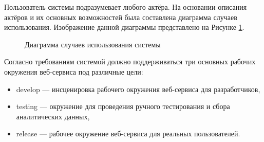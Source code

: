 Пользователь системы подразумевает любого актёра.
На основании описания актёров и их основных возможностей была составлена диаграмма случаев использования.
Изображение данной диаграммы представлено на Рисунке \ref{fig:use-cases}.

\begin{figure}[h!]
    \centering
    \caption{Диаграмма случаев использования системы}
    \label{fig:use-cases}
\end{figure}

Согласно требованиям системой должно поддерживаться три основных рабочих окружения веб-сервиса под различные цели:

\begin{itemize}
    \item develop --- инсценировка рабочего окружения веб-сервиса для разработчиков,
    \item testing --- окружение для проведения ручного тестирования и сбора аналитических данных,
    \item release --- рабочее окружение веб-сервиса для реальных пользователей.
\end{itemize}

